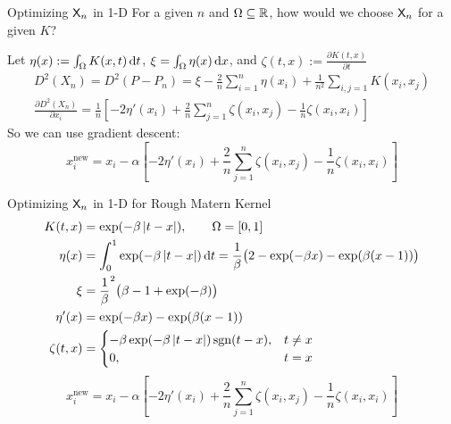 \documentclass[10pt,compress,xcolor={usenames,dvipsnames},aspectratio=169]{beamer}
\begin{document}
\begin{frame}{Optimizing $\mathsf{X}_n$ in 1-D}
	For a given $n$ and $\Omega \subseteq \mathbb{R}$, how would we choose $\mathsf{X}_n$ for a given $K$?  
	
	Let $\eta(x) := \int_\Omega K(x,t) \, {\rm d} t$, $\xi = \int_\Omega \eta(x) \, {\rm d} x$, and $\zeta(t,x) := \frac{\partial K(t,x)}{\partial t}$
	\begin{gather*}
		 D^2(X_n) = D^2(P-P_n) = \xi - \frac 2{n} \sum_{i=1}^n  \eta(x_i) + \frac 1{n^2} \sum_{i,j=1}K(x_i,x_j) \\
		 \frac{\partial D^2(X_n)}{\partial x_i} = \frac {1}{n} \left [- 2\eta'(x_i)  + \frac 2{n} \sum_{j =1}^n \zeta(x_i,x_j) - \frac 1{n} \zeta(x_i,x_i) \right]
	\end{gather*}
So we can use gradient descent:
\[
x_i^{\text{new}} = x_i - \alpha \left [- 2\eta'(x_i)  + \frac 2{n} \sum_{j =1}^n \zeta(x_i,x_j) - \frac 1{n} \zeta(x_i,x_i) \right]
\]
\end{frame}

\begin{frame}{Optimizing $\mathsf{X}_n$ in 1-D for Rough Matern Kernel}
	\vspace{-5ex}
	\begin{align*}
		K(t,x) &= \exp(-\beta \left \lvert t-x \right \rvert), \qquad \Omega = [0,1] \\
		\eta(x) &= \int_0^1 \exp(-\beta \left \lvert t-x \right \rvert) \, {\rm d} t = \frac 1\beta \bigl( 2  - \exp(-\beta x) - \exp(\beta(x-1)) \bigr) \\
		\xi & = \frac 1\beta^2 \bigl(  \beta - 1  + \exp(-\beta) \bigr)\\
		\eta'(x) &= \exp(-\beta x)  - \exp(\beta(x-1)) \\
		\zeta(t,x) & = \begin{cases} -\beta \exp(-\beta \left \lvert t-x \right \rvert) \operatorname{sgn}(t-x) ,& t \ne x\\
			0, & t = x
		\end{cases}
	\end{align*}
	\[
	x_i^{\text{new}} = x_i - \alpha \left [ -2\eta'(x_i)  + \frac 2{n} \sum_{j =1}^n \zeta(x_i,x_j) - \frac 1{n} \zeta(x_i,x_i) \right]
	\]
\end{frame}
\end{document}
